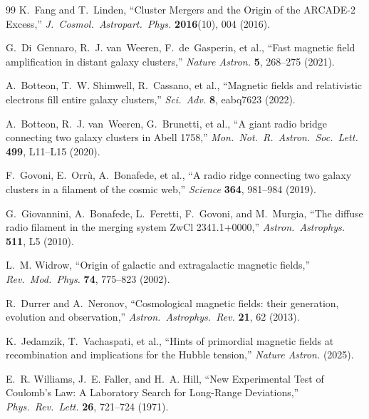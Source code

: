 \documentclass[a4paper]{article}
\begin{document}
\begin{thebibliography}{99}
K.~Fang and T.~Linden,
``Cluster Mergers and the Origin of the ARCADE-2 Excess,''
\textit{J.\ Cosmol.\ Astropart.\ Phys.} \textbf{2016}(10), 004 (2016).

G.~Di~Gennaro, R.~J. van~Weeren, F.~de~Gasperin, et al.,
``Fast magnetic field amplification in distant galaxy clusters,''
\textit{Nature Astron.} \textbf{5}, 268--275 (2021).

A.~Botteon, T.~W. Shimwell, R.~Cassano, et al.,
``Magnetic fields and relativistic electrons fill entire galaxy clusters,''
\textit{Sci.\ Adv.} \textbf{8}, eabq7623 (2022).

A.~Botteon, R.~J. van~Weeren, G.~Brunetti, et al.,
``A giant radio bridge connecting two galaxy clusters in Abell 1758,''
\textit{Mon.\ Not.\ R.\ Astron.\ Soc.\ Lett.} \textbf{499}, L11--L15 (2020).

F.~Govoni, E.~Orrù, A.~Bonafede, et al.,
``A radio ridge connecting two galaxy clusters in a filament of the cosmic web,''
\textit{Science} \textbf{364}, 981--984 (2019).

G.~Giovannini, A.~Bonafede, L.~Feretti, F.~Govoni, and M.~Murgia,
``The diffuse radio filament in the merging system ZwCl 2341.1+0000,''
\textit{Astron.\ Astrophys.} \textbf{511}, L5 (2010).

L.~M. Widrow,
``Origin of galactic and extragalactic magnetic fields,''
\textit{Rev.\ Mod.\ Phys.} \textbf{74}, 775--823 (2002).

R.~Durrer and A.~Neronov,
``Cosmological magnetic fields: their generation, evolution and observation,''
\textit{Astron.\ Astrophys.\ Rev.} \textbf{21}, 62 (2013).

K.~Jedamzik, T.~Vachaspati, et al.,
``Hints of primordial magnetic fields at recombination and implications for the
Hubble tension,''
\textit{Nature Astron.} (2025).

E.~R. Williams, J.~E. Faller, and H.~A. Hill,
``New Experimental Test of Coulomb's Law: A Laboratory Search for Long-Range
Deviations,''
\textit{Phys.\ Rev.\ Lett.} \textbf{26}, 721--724 (1971).

\end{thebibliography}
\end{document}
